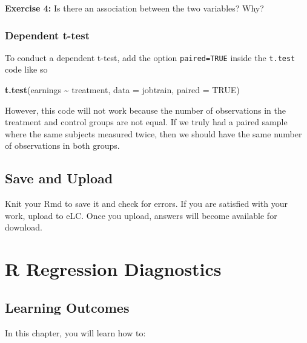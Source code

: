 \documentclass[
]{book}
\makeatletter
\newenvironment{Shaded}{\begin{snugshade}}{\end{snugshade}}
\newcommand{\AttributeTok}[1]{\textcolor[rgb]{0.27,0.27,0.27}{#1}}
\newcommand{\ConstantTok}[1]{\textcolor[rgb]{0.37,0.37,0.37}{#1}}
\newcommand{\FunctionTok}[1]{\textcolor[rgb]{0.27,0.27,0.27}{\textbf{#1}}}
\newcommand{\NormalTok}[1]{#1}
\newcommand{\SpecialCharTok}[1]{\textcolor[rgb]{0.43,0.43,0.43}{\textbf{#1}}}
\newenvironment{kframe}{%
\medskip{}
\setlength{\fboxsep}{.8em}
 \def\at@end@of@kframe{}%
 \ifinner\ifhmode%
  \def\at@end@of@kframe{\end{minipage}}%
  \begin{minipage}{\columnwidth}%
 \fi\fi%
 \def\FrameCommand##1{\hskip\@totalleftmargin \hskip-\fboxsep
 \colorbox{shadecolor}{##1}\hskip-\fboxsep
     \hskip-\linewidth \hskip-\@totalleftmargin \hskip\columnwidth}%
 \MakeFramed {\advance\hsize-\width
   \@totalleftmargin\z@ \linewidth\hsize
   \@setminipage}}%
 {\par\unskip\endMakeFramed%
 \at@end@of@kframe}
\renewenvironment{Shaded}{\begin{kframe}}{\end{kframe}}
\newenvironment{rmdblock}[1]
  {\begin{shaded*}
  }
  {\end{shaded*}
  }
\newenvironment{learncheck}
  {\begin{rmdblock}{warning}}
  {\end{rmdblock}}
\makeatother
\begin{document}
\begin{learncheck}
\textbf{Exercise 4:} Is there an association between the two variables?
Why?
\end{learncheck}

\hypertarget{dependent-t-test}{%
\subsection{Dependent t-test}\label{dependent-t-test}}

To conduct a dependent t-test, add the option \texttt{paired=TRUE} inside the \texttt{t.test} code like so

\begin{Shaded}
\begin{Highlighting}[]
\FunctionTok{t.test}\NormalTok{(earnings }\SpecialCharTok{\textasciitilde{}}\NormalTok{ treatment, }\AttributeTok{data =}\NormalTok{ jobtrain, }\AttributeTok{paired =} \ConstantTok{TRUE}\NormalTok{)}
\end{Highlighting}
\end{Shaded}

However, this code will not work because the number of observations in the treatment and control groups are not equal. If we truly had a paired sample where the same subjects measured twice, then we should have the same number of observations in both groups.

\hypertarget{save-and-upload-7}{%
\section{Save and Upload}\label{save-and-upload-7}}

Knit your Rmd to save it and check for errors. If you are satisfied with your work, upload to eLC. Once you upload, answers will become available for download.

\hypertarget{r-regression-diagnostics}{%
\chapter{R Regression Diagnostics}\label{r-regression-diagnostics}}

\hypertarget{learning-outcomes-1}{%
\section{Learning Outcomes}\label{learning-outcomes-1}}

In this chapter, you will learn how to:
\end{document}
